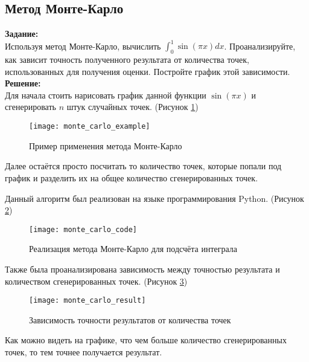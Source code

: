 \subsection*{Метод Монте-Карло}

\textbf{Задание:}\\
Используя метод Монте-Карло, вычислить $\int_{0}^{1} \sin(\pi x) dx$. Проанализируйте, как зависит точность полученного результата от количества точек, использованных для получения оценки. Постройте график этой зависимости.\\

\textbf{Решение:}\\
Для начала стоить нарисовать график данной функции $\sin (\pi x)$ и сгенерировать $n$ штук случайных точек.  (Рисунок \ref{fig:monte_carlo_example})
\begin{figure}[h]
	\centering \texttt{[image: monte\_carlo\_example]}
	\caption{Пример применения метода Монте-Карло}
	\label{fig:monte_carlo_example}
\end{figure}

Далее остаётся просто посчитать то количество точек, которые попали под график и разделить их на общее количество сгенерированных точек.

\newpage

Данный алгоритм был реализован на языке программирования Python. (Рисунок \ref{fig:monte_carlo_code})
\begin{figure}[h]
	\centering \texttt{[image: monte\_carlo\_code]}
	\caption{Реализация метода Монте-Карло для подсчёта интеграла}
	\label{fig:monte_carlo_code}
\end{figure}

Также была проанализирована зависимость между точностью результата и количеством сгенерированных точек. (Рисунок \ref{fig:monte_carlo_result})
\begin{figure}[h]
	\centering \texttt{[image: monte\_carlo\_result]}
	\caption{Зависимость точности результатов от количества точек}
	\label{fig:monte_carlo_result}
\end{figure}

Как можно видеть на графике, что чем больше количество сгенерированных точек, то тем точнее получается результат.